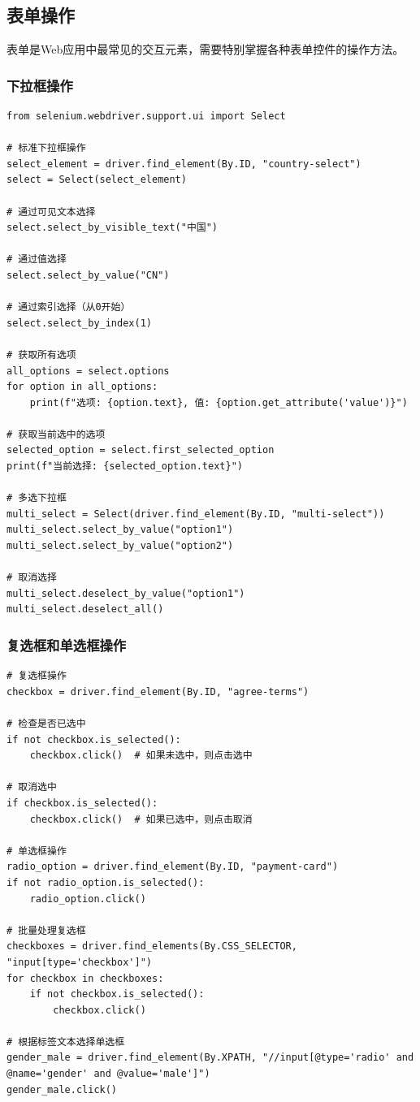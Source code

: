 \subsection{表单操作}

表单是Web应用中最常见的交互元素，需要特别掌握各种表单控件的操作方法。

\subsubsection{下拉框操作}

\begin{lstlisting}[style=demostyle,numbers=none]
from selenium.webdriver.support.ui import Select

# 标准下拉框操作
select_element = driver.find_element(By.ID, "country-select")
select = Select(select_element)

# 通过可见文本选择
select.select_by_visible_text("中国")

# 通过值选择
select.select_by_value("CN")

# 通过索引选择（从0开始）
select.select_by_index(1)

# 获取所有选项
all_options = select.options
for option in all_options:
    print(f"选项: {option.text}, 值: {option.get_attribute('value')}")

# 获取当前选中的选项
selected_option = select.first_selected_option
print(f"当前选择: {selected_option.text}")

# 多选下拉框
multi_select = Select(driver.find_element(By.ID, "multi-select"))
multi_select.select_by_value("option1")
multi_select.select_by_value("option2")

# 取消选择
multi_select.deselect_by_value("option1")
multi_select.deselect_all()
\end{lstlisting}

\subsubsection{复选框和单选框操作}

\begin{lstlisting}[style=demostyle,numbers=none]
# 复选框操作
checkbox = driver.find_element(By.ID, "agree-terms")

# 检查是否已选中
if not checkbox.is_selected():
    checkbox.click()  # 如果未选中，则点击选中

# 取消选中
if checkbox.is_selected():
    checkbox.click()  # 如果已选中，则点击取消

# 单选框操作
radio_option = driver.find_element(By.ID, "payment-card")
if not radio_option.is_selected():
    radio_option.click()

# 批量处理复选框
checkboxes = driver.find_elements(By.CSS_SELECTOR, "input[type='checkbox']")
for checkbox in checkboxes:
    if not checkbox.is_selected():
        checkbox.click()

# 根据标签文本选择单选框
gender_male = driver.find_element(By.XPATH, "//input[@type='radio' and @name='gender' and @value='male']")
gender_male.click()
\end{lstlisting}

